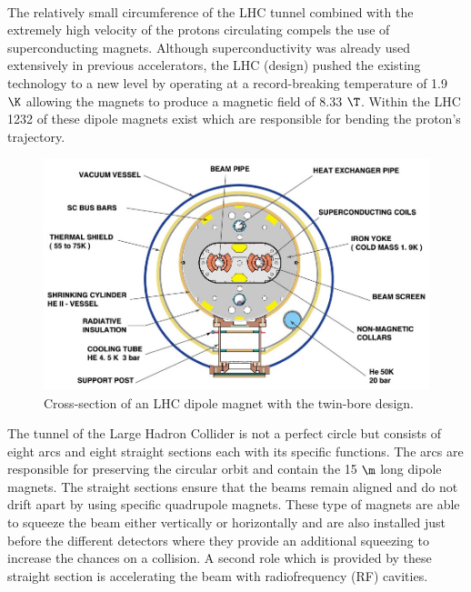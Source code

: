 \\
The relatively small circumference of the LHC tunnel combined with the extremely high velocity of the protons circulating compels the use of superconducting magnets. Although superconductivity was already used extensively in previous accelerators, the LHC (design) pushed the existing technology to a new level by operating at a record-breaking temperature of 1.9 $\K$ allowing the magnets to produce a magnetic field of 8.33 $\T$. Within the LHC 1232 of these dipole magnets exist which are responsible for bending the proton's trajectory.
\begin{figure}[h!t]
 \centering
 \includegraphics[width = 0.6 \textwidth]{Chapters/Chapter2_CERN/Figures/lhc-pho-1998-341.jpg}
 \caption{Cross-section of an LHC dipole magnet with the twin-bore design.}%
 \label{fig::LHCDipole}
\end{figure}

The tunnel of the Large Hadron Collider is not a perfect circle but consists of eight arcs and eight straight sections each with its specific functions. 
The arcs are responsible for preserving the circular orbit and contain the 15 $\m$ long dipole magnets.
The straight sections ensure that the beams remain aligned and do not drift apart by using specific quadrupole magnets. These type of magnets are able to squeeze the beam either vertically or horizontally and are also installed just before the different detectors where they provide an additional squeezing to increase the chances on a collision. A second role which is provided by these straight section is accelerating the beam with radiofrequency (RF) cavities.

